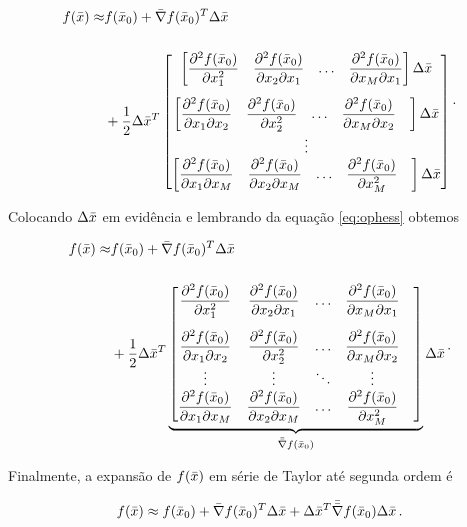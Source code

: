 \begin{equation}
\begin{split}
f(\bar{x}) \approx
&f(\bar{x}_0) + \bar{\nabla}f(\bar{x}_0)^T\Delta\bar{x}\
\\[0.5cm]
&+ \dfrac{1}{2}\Delta\bar{x}^T
\begin{bmatrix}
    \begin{bmatrix}
    \dfrac{\partial^2 f(\bar{x}_0)}{\partial x_1^2} &
    \dfrac{\partial^2 f(\bar{x}_0)}{\partial x_2\partial x_1} &
    \ldots &
    \dfrac{\partial^2 f(\bar{x}_0)}{\partial x_M\partial x_1}
    \end{bmatrix}
    \Delta\bar{x}
    \\[0.5cm]
    \begin{bmatrix}
    \dfrac{\partial^2 f(\bar{x}_0)}{\partial x_1\partial x_2} &
    \dfrac{\partial^2 f(\bar{x}_0)}{\partial x_2^2} &
    \ldots &
    \dfrac{\partial^2 f(\bar{x}_0)}{\partial x_M\partial x_2} &
    \end{bmatrix}
    \Delta\bar{x}
    \\
    \vdots
    \\
    \begin{bmatrix}
    \dfrac{\partial^2 f(\bar{x}_0)}{\partial x_1\partial x_M} &
    \dfrac{\partial^2 f(\bar{x}_0)}{\partial x_2\partial x_M} &
    \ldots &
    \dfrac{\partial^2 f(\bar{x}_0)}{\partial x_M^2} &
    \end{bmatrix}
    \Delta\bar{x}
\end{bmatrix}
\end{split}
\thinspace .
\end{equation}

\noindent Colocando $\Delta\bar{x}$ em evidência e lembrando da equação
\ref{eq:ophess} obtemos

\begin{equation}
\begin{split}
f(\bar{x}) \approx
&f(\bar{x}_0) + \bar{\nabla}f(\bar{x}_0)^T\Delta\bar{x}\
\\[0.5cm]
&+ \dfrac{1}{2}\Delta\bar{x}^T
\underbrace{
\begin{bmatrix}
    \dfrac{\partial^2 f(\bar{x}_0)}{\partial x_1^2} &
    \dfrac{\partial^2 f(\bar{x}_0)}{\partial x_2\partial x_1} &
    \ldots &
    \dfrac{\partial^2 f(\bar{x}_0)}{\partial x_M\partial x_1}
    \\[0.5cm]
    \dfrac{\partial^2 f(\bar{x}_0)}{\partial x_1\partial x_2} &
    \dfrac{\partial^2 f(\bar{x}_0)}{\partial x_2^2} &
    \ldots &
    \dfrac{\partial^2 f(\bar{x}_0)}{\partial x_M\partial x_2} &
    \\
    \vdots & \vdots & \ddots & \vdots
    \\
    \dfrac{\partial^2 f(\bar{x}_0)}{\partial x_1\partial x_M} &
    \dfrac{\partial^2 f(\bar{x}_0)}{\partial x_2\partial x_M} &
    \ldots &
    \dfrac{\partial^2 f(\bar{x}_0)}{\partial x_M^2} &
\end{bmatrix}}_{\bar{\bar{\nabla}}f(\bar{x}_0)}
\Delta\bar{x}
\end{split}
\thinspace .
\end{equation}

\noindent Finalmente, a expansão de $f(\bar{x})$ em série de Taylor até
segunda ordem é

\begin{equation}
f(\bar{x}) \approx
    f(\bar{x}_0) +
    \bar{\nabla}f(\bar{x}_0)^T\Delta\bar{x} +
    \Delta\bar{x}^T\bar{\bar{\nabla}}f(\bar{x}_0)\Delta\bar{x}
\thinspace .
\end{equation}
